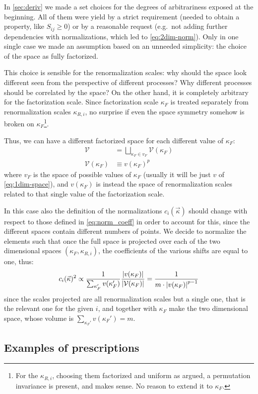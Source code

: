 In \cref{sec:deriv} we made a set choices for the degrees of arbitrariness
exposed at the beginning.
All of them were yield by a strict requirement (needed to obtain a property,
like $S_{ij} \ge 0$) or by a reasonable request (e.g.\ not adding further
dependencies with normalizations, which led to \cref{eq:2dim-norm}).
Only in one single case we made an assumption based on an unneeded simplicity:
the choice of the space as fully factorized.

This choice is sensible for the renormalization scales: why should the space
look different seen from the perspective of different processes? Why different
processes should be correlated by the space?
On the other hand, it is completely arbitrary for the factorization scale.
Since factorization scale $\kappa_F$ is treated separately from renormalization
scales $\kappa_{R,i}$, no surprise if even the space symmetry somehow is broken
on $\kappa_F$\footnote{
    For the $\kappa_{R,i}$, choosing them factorized and uniform as argued, a
    permutation invariance is present, and makes sense.
    No reason to extend it to $\kappa_F$.
}.

Thus, we can have a different factorized space for each different value of $\kappa_F$:
\begin{align}
    \label{eq:sliced-space}
    \mathcal{V} &= \bigsqcup_{\kappa_F \in v_F} \mathcal{V}(\kappa_F)\\
    \label{eq:1f-factorized}
    \mathcal{V}(\kappa_F) &\equiv v(\kappa_F)^p
\end{align}
where $v_F$ is the space of possible values of $\kappa_F$ (usually it will be
just $v$ of \cref{eq:1dim-space}), and $v(\kappa_F)$ is instead the space of
renormalization scales related to that single value of the factorization scale.

In this case also the definition of the normalizations $c_i(\vec{\kappa})$
should change with respect to those defined in \cref{eq:norm_coeff} in order to
account for this, since the different spaces contain different numbers of
points.
We decide to normalize the elements such that once the full space is projected
over each of the two dimensional spaces $(\kappa_F, \kappa_{R,i})$, the
coefficients of the various shifts are equal to one, thus:
\begin{equation}
    \label{eq:sliced-norm}
    c_i(\vec{\kappa})^2 \propto \frac{1}{\sum_{\kappa_F'}v(\kappa_F')} \frac{\abs{v(\kappa_F)}}{\abs{\mathcal{V}(\kappa_F)}}
        = \frac{1}{m \cdot \abs{v(\kappa_F)}^{p-1}}
\end{equation}
since the scales projected are all renormalization scales but a single one,
that is the relevant one for the given $i$, and together with $\kappa_F$ make
the two dimensional space, whose volume is $\sum_{\kappa_F'}v(\kappa_F') = m$.

\subsection{Examples of prescriptions}
\label{sec:slices-ex}

